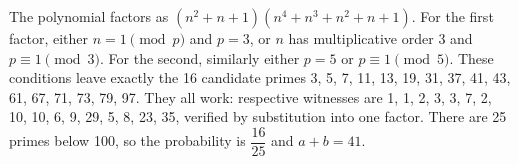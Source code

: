 The polynomial factors as $(n^2+n+1)(n^4+n^3+n^2+n+1)$. For the first factor, either $n=1\pmod p$ and $p=3$, or $n$ has multiplicative order 3 and $p\equiv1\pmod3$. For the second, similarly either $p=5$ or $p\equiv1\pmod5$. These conditions leave exactly the 16 candidate primes 3, 5, 7, 11, 13, 19, 31, 37, 41, 43, 61, 67, 71, 73, 79, 97. They all work: respective witnesses are 1, 1, 2, 3, 3, 7, 2, 10, 10, 6, 9, 29, 5, 8, 23, 35, verified by substitution into one factor. There are 25 primes below 100, so the probability is $\dfrac{16}{25}$ and $\boxed{a+b=41}$.

